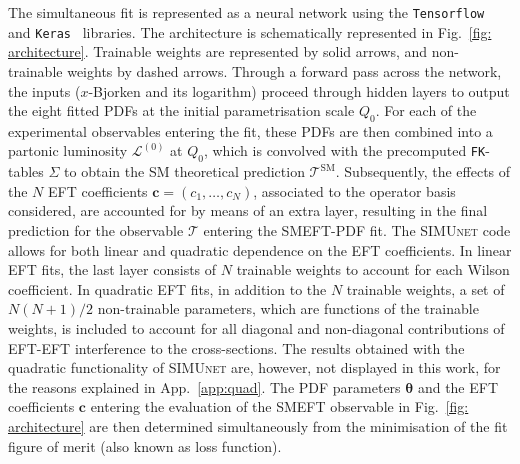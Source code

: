 \documentclass[withindex,glossary]{cam-thesis}
\newcommand{\simunet}{\textsc{SIMUnet}}
\begin{document}
The simultaneous fit is represented as a neural network using the
\texttt{Tensorflow}~\cite{tensorflow2015:whitepaper} and
\texttt{Keras}~\cite{chollet2015keras} libraries. The architecture is
schematically represented in Fig.~\ref{fig: architecture}.
%
Trainable weights are represented by solid arrows, and
non-trainable weights by dashed arrows.  Through a
forward pass across the network, the inputs ($x$-Bjorken and its logarithm) proceed through
 hidden layers  to output the eight fitted PDFs at
the initial parametrisation scale $Q_0$.
%
For each of the experimental observables entering the fit, these
PDFs are then combined into a partonic luminosity $\mathcal{L}^{(0)}$ at $Q_0$,
which is convolved with the precomputed {\tt FK}-tables $\Sigma$ to obtain the SM
theoretical prediction $\mathcal{T}^\text{SM}$.
%
%
Subsequently, the effects of the $N$ EFT coefficients $\boldsymbol{c}=(c_1,\ldots,c_N)$,
associated to the operator basis considered,
are accounted for by means of an extra layer, resulting in the
final prediction for the observable $\mathcal{T}$ entering the SMEFT-PDF fit.
%
The \simunet{} code allows for both linear and quadratic dependence on the EFT
coefficients. In linear EFT fits, the last layer consists of $N$ trainable
weights to account for each Wilson coefficient. In quadratic EFT fits, in
addition to the $N$ trainable weights, a set of $N(N+1)/2$ non-trainable
parameters, which are functions of the trainable weights, is included to account
for all diagonal and non-diagonal contributions of EFT-EFT interference to the
cross-sections. The results obtained with the quadratic functionality
of \simunet{} are, however, not displayed in this work, for the reasons explained in
App.~\ref{app:quad}. 
The PDF parameters $\pmb{\theta}$
and the EFT coefficients $\boldsymbol{c}$ entering the evaluation
of the SMEFT observable in Fig.~\ref{fig: architecture} are then determined
simultaneously from the minimisation of the fit figure of merit (also
known as loss function).
\end{document}
